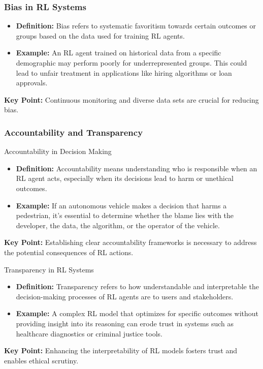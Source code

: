 \documentclass{beamer}
\begin{document}
\begin{frame}[fragile]
    \frametitle{Bias in RL Systems}
    \begin{itemize}
        \item \textbf{Definition:} Bias refers to systematic favoritism towards certain outcomes or groups based on the data used for training RL agents.
        \item \textbf{Example:} 
        An RL agent trained on historical data from a specific demographic may perform poorly for underrepresented groups. 
        This could lead to unfair treatment in applications like hiring algorithms or loan approvals.
    \end{itemize}
    \textbf{Key Point:} Continuous monitoring and diverse data sets are crucial for reducing bias.
\end{frame}

\begin{frame}[fragile]
    \frametitle{Accountability and Transparency}
    \begin{block}{Accountability in Decision Making}
        \begin{itemize}
            \item \textbf{Definition:} Accountability means understanding who is responsible when an RL agent acts, especially when its decisions lead to harm or unethical outcomes.
            \item \textbf{Example:} 
            If an autonomous vehicle makes a decision that harms a pedestrian, it's essential to determine whether the blame lies with the developer, the data, the algorithm, or the operator of the vehicle.
        \end{itemize}
        \textbf{Key Point:} Establishing clear accountability frameworks is necessary to address the potential consequences of RL actions.
    \end{block}
    
    \begin{block}{Transparency in RL Systems}
        \begin{itemize}
            \item \textbf{Definition:} Transparency refers to how understandable and interpretable the decision-making processes of RL agents are to users and stakeholders.
            \item \textbf{Example:} 
            A complex RL model that optimizes for specific outcomes without providing insight into its reasoning can erode trust in systems such as healthcare diagnostics or criminal justice tools.
        \end{itemize}
        \textbf{Key Point:} Enhancing the interpretability of RL models fosters trust and enables ethical scrutiny.
    \end{block}
\end{frame}
\end{document}
